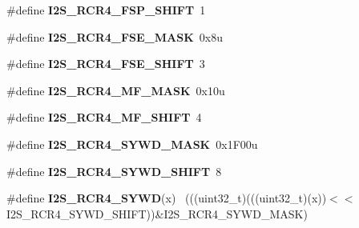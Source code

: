 \begin{DoxyCompactItemize}
\item 
\hypertarget{group___i2_s___register___masks_gac009d35af5a1ed6a1201d23dbcfcea72}{}\#define {\bfseries I2\+S\+\_\+\+R\+C\+R4\+\_\+\+F\+S\+P\+\_\+\+S\+H\+I\+F\+T}~1\label{group___i2_s___register___masks_gac009d35af5a1ed6a1201d23dbcfcea72}

\item 
\hypertarget{group___i2_s___register___masks_ga9c6885d55f2de2dcd4649b15582dbd63}{}\#define {\bfseries I2\+S\+\_\+\+R\+C\+R4\+\_\+\+F\+S\+E\+\_\+\+M\+A\+S\+K}~0x8u\label{group___i2_s___register___masks_ga9c6885d55f2de2dcd4649b15582dbd63}

\item 
\hypertarget{group___i2_s___register___masks_ga37d794e272f05da947af5073c3340a6e}{}\#define {\bfseries I2\+S\+\_\+\+R\+C\+R4\+\_\+\+F\+S\+E\+\_\+\+S\+H\+I\+F\+T}~3\label{group___i2_s___register___masks_ga37d794e272f05da947af5073c3340a6e}

\item 
\hypertarget{group___i2_s___register___masks_ga7256d017dda987fcd8ac9daae80208b7}{}\#define {\bfseries I2\+S\+\_\+\+R\+C\+R4\+\_\+\+M\+F\+\_\+\+M\+A\+S\+K}~0x10u\label{group___i2_s___register___masks_ga7256d017dda987fcd8ac9daae80208b7}

\item 
\hypertarget{group___i2_s___register___masks_gace2764bf30039c2f06ef202b86052ba4}{}\#define {\bfseries I2\+S\+\_\+\+R\+C\+R4\+\_\+\+M\+F\+\_\+\+S\+H\+I\+F\+T}~4\label{group___i2_s___register___masks_gace2764bf30039c2f06ef202b86052ba4}

\item 
\hypertarget{group___i2_s___register___masks_ga1fb484ccadebeaab844b5dcfa0c89950}{}\#define {\bfseries I2\+S\+\_\+\+R\+C\+R4\+\_\+\+S\+Y\+W\+D\+\_\+\+M\+A\+S\+K}~0x1\+F00u\label{group___i2_s___register___masks_ga1fb484ccadebeaab844b5dcfa0c89950}

\item 
\hypertarget{group___i2_s___register___masks_ga5ad9893dd40464452393719f845ae58d}{}\#define {\bfseries I2\+S\+\_\+\+R\+C\+R4\+\_\+\+S\+Y\+W\+D\+\_\+\+S\+H\+I\+F\+T}~8\label{group___i2_s___register___masks_ga5ad9893dd40464452393719f845ae58d}

\item 
\hypertarget{group___i2_s___register___masks_gac521798b600f76c7a2348fbec411c28c}{}\#define {\bfseries I2\+S\+\_\+\+R\+C\+R4\+\_\+\+S\+Y\+W\+D}(x)                                              ~(((uint32\+\_\+t)(((uint32\+\_\+t)(x))$<$$<$I2\+S\+\_\+\+R\+C\+R4\+\_\+\+S\+Y\+W\+D\+\_\+\+S\+H\+I\+F\+T))\&I2\+S\+\_\+\+R\+C\+R4\+\_\+\+S\+Y\+W\+D\+\_\+\+M\+A\+S\+K)\label{group___i2_s___register___masks_gac521798b600f76c7a2348fbec411c28c}


\end{DoxyCompactItemize}
